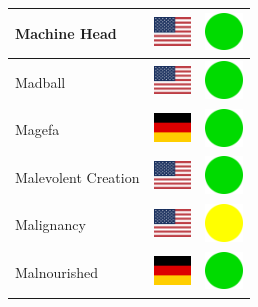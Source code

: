 \documentclass[12pt, a4paper, twoside]{report}
\begin{document}
\begin{center}
\begin{longtable}{|p{5cm}|p{2cm}|p{2cm}|}
 Machine Head                                               & \includegraphics[width=1cm]{../img/flags/us} &   \includegraphics[width=1cm]{../likes/y} \\ \hline
 Madball                                                    & \includegraphics[width=1cm]{../img/flags/us} &   \includegraphics[width=1cm]{../likes/y} \\ \hline
 Magefa                                                     & \includegraphics[width=1cm]{../img/flags/de} &   \includegraphics[width=1cm]{../likes/y} \\ \hline
 Malevolent Creation                                        & \includegraphics[width=1cm]{../img/flags/us} &   \includegraphics[width=1cm]{../likes/y} \\ \hline
 Malignancy                                                 & \includegraphics[width=1cm]{../img/flags/us} &   \includegraphics[width=1cm]{../likes/m} \\ \hline
 Malnourished                                               & \includegraphics[width=1cm]{../img/flags/de} &   \includegraphics[width=1cm]{../likes/y} \\ \hline

\end{longtable}
\end{center}
\end{document}
